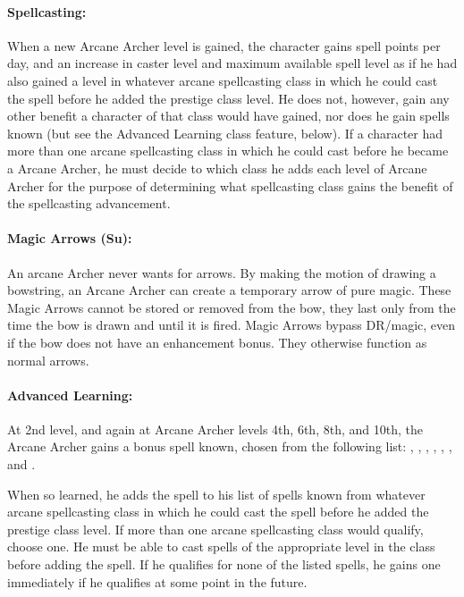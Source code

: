 \paragraph{Spellcasting:} When a new Arcane Archer level is gained, the character gains spell points per day, and an increase in caster level and maximum available spell level as if he had also gained a level in whatever arcane spellcasting class in which he could cast the  spell before he added the prestige class level. 
He does not, however, gain any other benefit a character of that class would have gained, nor does he gain spells known (but see the Advanced Learning class feature, below). 
If a character had more than one arcane spellcasting class in which he could cast  before he became a Arcane Archer, he must decide to which class he adds each level of Arcane Archer for the purpose of determining what spellcasting class gains the benefit of the spellcasting advancement.

\paragraph{Magic Arrows (Su):}
An arcane Archer never wants for arrows.
By making the motion of drawing a bowstring, an Arcane Archer can create a temporary arrow of pure magic.
These Magic Arrows cannot be stored or removed from the bow, they last only from the time the bow is drawn and until it is fired.
Magic Arrows bypass DR/magic, even if the bow does not have an enhancement bonus.
They otherwise function as normal arrows.

\paragraph{Advanced Learning:}
At 2nd level, and again at Arcane Archer levels 4th, 6th, 8th, and 10th, the Arcane Archer gains a bonus spell known, chosen from the following list: , , , , , , and .

When so learned, he adds the spell to his list of spells known from whatever arcane spellcasting class in which he could cast the  spell before he added the prestige class level. If more than one arcane spellcasting class would qualify, choose one. He must be able to cast spells of the appropriate level in the class before adding the spell. If he qualifies for none of the listed spells, he gains one immediately if he qualifies at some point in the future.

